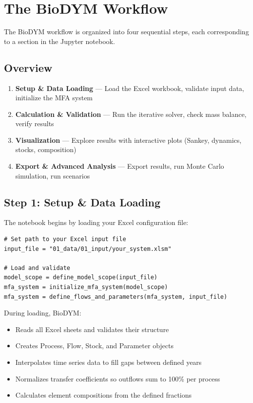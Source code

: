 \chapter{The BioDYM Workflow}
\label{ch:workflow}

The BioDYM workflow is organized into four sequential steps, each corresponding to a section in the Jupyter notebook.

\section{Overview}

\begin{enumerate}
  \item \textbf{Setup \& Data Loading} --- Load the Excel workbook, validate input data, initialize the MFA system
  \item \textbf{Calculation \& Validation} --- Run the iterative solver, check mass balance, verify results
  \item \textbf{Visualization} --- Explore results with interactive plots (Sankey, dynamics, stocks, composition)
  \item \textbf{Export \& Advanced Analysis} --- Export results, run Monte Carlo simulation, run scenarios
\end{enumerate}

\section{Step 1: Setup \& Data Loading}

The notebook begins by loading your Excel configuration file:

\begin{lstlisting}[style=python]
# Set path to your Excel input file
input_file = "01_data/01_input/your_system.xlsm"

# Load and validate
model_scope = define_model_scope(input_file)
mfa_system = initialize_mfa_system(model_scope)
mfa_system = define_flows_and_parameters(mfa_system, input_file)
\end{lstlisting}

During loading, BioDYM:
\begin{itemize}
  \item Reads all Excel sheets and validates their structure
  \item Creates Process, Flow, Stock, and Parameter objects
  \item Interpolates time series data to fill gaps between defined years
  \item Normalizes transfer coefficients so outflows sum to 100\% per process
  \item Calculates element compositions from the defined fractions
\end{itemize}

